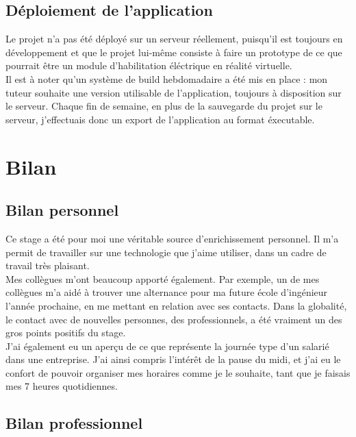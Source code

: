 \documentclass[a4paper]{article}
\begin{document}
    \subsection{Déploiement de l'application}
   
    Le projet n'a pas été déployé sur un serveur réellement, puisqu'il est toujours en développement et que le projet lui-même consiste à faire un prototype de ce que pourrait être un module d'habilitation éléctrique en réalité virtuelle. \\

    Il est à noter qu'un système de build hebdomadaire a été mis en place : mon tuteur souhaite une version utilisable de l'application, toujours à disposition sur le serveur. Chaque fin de semaine, en plus de la sauvegarde du projet sur le serveur, j'effectuais donc un export de l'application au format éxecutable. \\
    
    \section{Bilan}
    
    \subsection{Bilan personnel}

        Ce stage a été pour moi une véritable source d'enrichissement personnel. Il m'a permit de travailler sur une technologie que j'aime utiliser, dans un cadre de travail très plaisant. \\

        Mes collègues m'ont beaucoup apporté également. Par exemple, un de mes collègues m'a aidé à trouver une alternance pour ma future école d'ingénieur l'année prochaine, en me mettant en relation avec ses contacts. Dans la globalité, le contact avec de nouvelles personnes, des professionnels, a été vraiment un des gros points positifs du stage. \\

        J'ai également eu un aperçu de ce que représente la journée type d'un salarié dans une entreprise. J'ai ainsi compris l'intérêt de la pause du midi, et j'ai eu le confort de pouvoir organiser mes horaires comme je le souhaite, tant que je faisais mes 7 heures quotidiennes. \\

    \subsection{Bilan professionnel}
\end{document}
